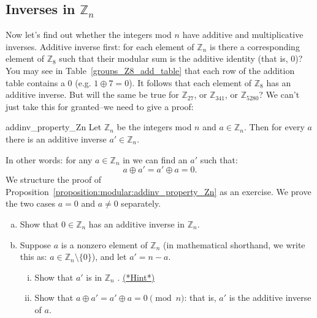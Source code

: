 \subsection{Inverses in ${\mathbb Z}_n$}

Now let's find out whether the integers mod $n$ have additive and multiplicative inverses. Additive inverse first:  for each element of  ${\mathbb Z}_n$ is there a corresponding element of ${\mathbb Z}_8$ such that their modular sum is the additive identity (that is, 0)?  You may see in Table~\ref{groups_Z8_add_table} that each row of the addition table contains a $0$ (e.g. $1\oplus 7 = 0$).  It follows that each element  of ${\mathbb Z}_8$ has an additive inverse. But will the same be true for ${\mathbb Z}_{27}$, or ${\mathbb Z}_{341}$,  or ${\mathbb Z}_{5280}$? We can't just take this for granted--we need to give a proof:

\begin{prop}{addinv_property_Zn}
Let ${\mathbb Z}_n$ be the  integers mod $n$ and $a \in {\mathbb Z}_n$. Then for every  $a$  there is an additive inverse $a' \in {\mathbb Z}_n$.  

In other words: for any $a \in {\mathbb Z}_n$ in  we can find an $a'$ such that:
\[
a \oplus a' = a' \oplus a  = 0.
\]
We structure the proof of Proposition~\ref{proposition:modular:addinv_property_Zn} as an exercise. We prove the two cases $a=0$ and $a \neq 0$ separately.

\begin{exercise}{58}

\begin{enumerate}[(a)]
\item
Show that  $0 \in {\mathbb Z}_n$ has an additive inverse in ${\mathbb Z}_n$.

\item
Suppose $a$ is a nonzero element of ${\mathbb Z}_n$  (in mathematical shorthand, we write this as: $a \in {\mathbb Z}_n \setminus \{0\}$), and let $a' = n-a$.
\begin{enumerate}[(i)]
\item
Show that $a'$ is in ${\mathbb Z}_n$ .
\hyperref[sec:modular_arithmetic:hints]{(*Hint*)}
\item
Show that $a \oplus a' = a' \oplus a  = 0 \pmod{ n}$: that is, $a'$ is the additive inverse of $a$.
\end{enumerate}
\end{enumerate}
\end{exercise}
\end{prop}

